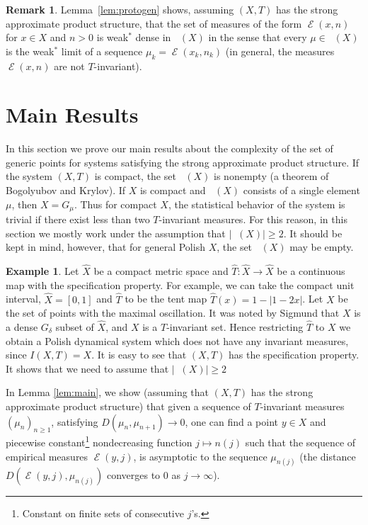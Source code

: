 \documentclass{amsart}
\theoremstyle{definition}
\newtheorem{rem}[thm]{Remark}
\newtheorem{exam}[thm]{Example}
\DeclareMathOperator{\Emp}{\mathcal{E}}%
\DeclareMathOperator{\MT}{\mathcal{M}_{\mathit T} }
\begin{document}
\begin{rem} \label{rem:wsl}
Lemma~\ref{lem:protogen} shows, assuming $(X,T)$ has the strong approximate product structure, that
the set of measures of the form $\Emp(x,n)$ for $x\in X$ and $n>0$
is weak${}^*$ dense in $\MT(X)$ in the sense that every $\mu \in \MT(X)$ is the
weak${}^*$ limit of a sequence $\mu_k=\Emp(x_k,n_k)$ (in general, the measures $\Emp(x,n)$
are not $T$-invariant).
\end{rem}














\section{Main Results} \label{sec:ws}

In this section we prove our main results about the complexity of
the set of generic points for systems satisfying the strong approximate
product structure. If the system $(X, T)$ is compact, the set $\MT(X)$ is nonempty (a theorem of Bogolyubov and Krylov). If $X$ is compact and $\MT(X)$ consists of a single element $ \mu $, then $X = G_\mu$. Thus for compact $X$, the statistical behavior of the system is trivial if there exist less than two $T$-invariant measures. For this reason, in this section we mostly work under the assumption that $| \MT(X) | \ge 2$. It should be kept in mind, however, that for general Polish $X$, the set $\MT(X)$ may be empty.

\begin{exam} Let $\hat X$ be a compact metric space and $\hat{T}\colon \hat{X}\to\hat{X}$ be a continuous map with the specification property. For example, we can take the compact unit interval, $\hat{X}=[0,1]$ and $\hat{T}$ to be the tent map $\hat{T}(x)=1-|1-2x|$. Let $X$ be the set of points with the maximal oscillation. It was noted by Sigmund that  $X$ is a dense $G_\delta$ subset of $\hat{X}$, and $X$ is a $T$-invariant set. Hence restricting $\hat{T}$ to $X$ we obtain a Polish dynamical system which does not have any invariant measures, since $I(X,T)=X$. It is easy to see that $(X,T)$ has the specification property. It shows that we need to assume that $| \MT(X) | \ge 2$
\end{exam}

In Lemma \ref{lem:main}, we show (assuming that $(X,T)$ has the strong approximate product structure) that given a sequence of $T$-invariant measures $(\mu_n)_{n \ge 1}$, satisfying $D(\mu_n, \mu_{n+1}) \to 0$, one can find a point $y \in X$ and piecewise constant\footnote{Constant on finite sets of consecutive $j$'s.} nondecreasing function $j\mapsto n(j)$ such that the sequence of empirical measures $\Emp(y, j)$, is asymptotic to the sequence $\mu_{n(j)}$ (the distance
$D(\Emp(y,j),\mu_{n(j)})$ converges to $0$ as $j\to\infty$).
\end{document}
